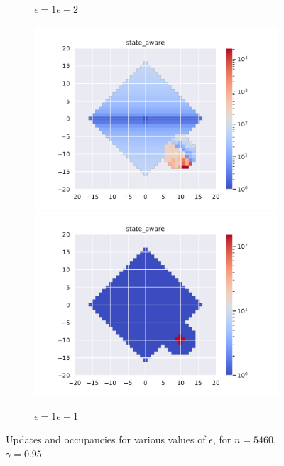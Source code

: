 \documentclass[runningheads]{llncs}
\begin{document}
\begin{figure}[H]
\begin{subfigure}[b]{\linewidth}
		\caption{$\epsilon=1e-2$}
	\end{subfigure}
	\begin{subfigure}[b]{\linewidth}
		\centering
		\includegraphics[width=0.49\linewidth]{img/epsilon/1e-1/updates_state_aware.pdf}
		\includegraphics[width=0.49\linewidth]{img/epsilon/1e-2/occupations_state_aware.pdf}
		\caption{$\epsilon=1e-1$}
	\end{subfigure}
	\caption{Updates and occupancies for various values of $\epsilon$, for $n = 5460$, $\gamma=0.95$}
	\label{fig:epsilon_1}
\end{figure}
\end{document}
